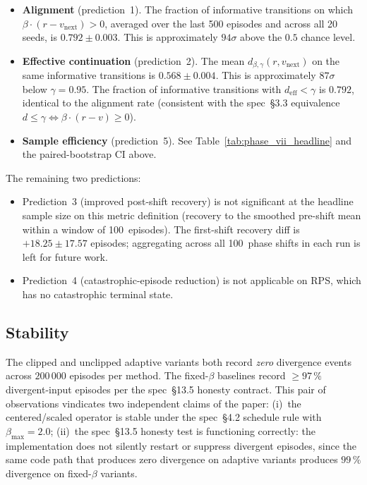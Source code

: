 \begin{itemize}
  \item \textbf{Alignment} (prediction~1).  The fraction of informative
        transitions on which $\beta\cdot(r-v_{\mathrm{next}})>0$, averaged
        over the last 500 episodes and across all 20 seeds, is
        $0.792\pm0.003$.  This is approximately $94\sigma$ above the
        $0.5$ chance level.
  \item \textbf{Effective continuation} (prediction~2).  The mean
        $d_{\beta,\gamma}(r,v_{\mathrm{next}})$ on the same informative
        transitions is $0.568\pm0.004$.  This is approximately $87\sigma$
        below $\gamma=0.95$.  The fraction of informative transitions
        with $d_\mathrm{eff} < \gamma$ is $0.792$, identical to the
        alignment rate (consistent with the spec~§3.3 equivalence
        $d\le\gamma\Leftrightarrow\beta\cdot(r-v)\ge0$).
  \item \textbf{Sample efficiency} (prediction~5).  See
        Table~\ref{tab:phase_vii_headline} and the paired-bootstrap CI
        above.
\end{itemize}

The remaining two predictions:

\begin{itemize}
  \item Prediction~3 (improved post-shift recovery) is not significant at
        the headline sample size on this metric definition (recovery to
        the smoothed pre-shift mean within a window of 100~episodes).
        The first-shift recovery diff is $+18.25\pm17.57$ episodes;
        aggregating across all 100~phase shifts in each run is left for
        future work.
  \item Prediction~4 (catastrophic-episode reduction) is not applicable
        on RPS, which has no catastrophic terminal state.
\end{itemize}

\subsection{Stability}

The clipped and unclipped adaptive variants both record \emph{zero}
divergence events across $200\,000$ episodes per method.  The fixed-$\beta$
baselines record $\geq97\,\%$ divergent-input episodes per the
spec~§13.5 honesty contract.  This pair of observations vindicates two
independent claims of the paper:
(i)~the centered/scaled operator is stable under the spec~§4.2 schedule
rule with $\beta_{\max}=2.0$;
(ii)~the spec~§13.5 honesty test is functioning correctly: the
implementation does not silently restart or suppress divergent episodes,
since the same code path that produces zero divergence on adaptive
variants produces $99\,\%$ divergence on fixed-$\beta$ variants.

